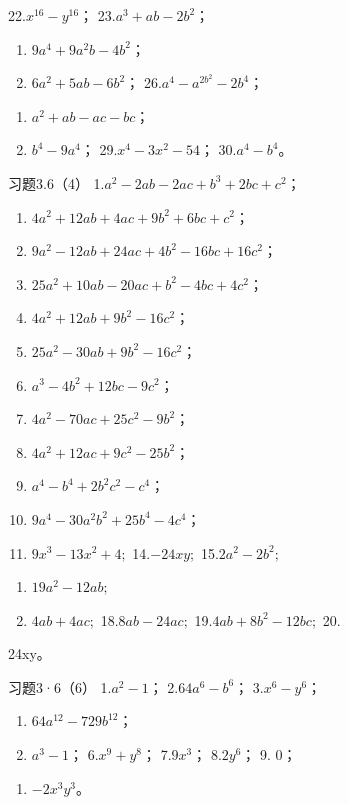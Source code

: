 22.\(x^{16} - y^{16}\)； 23.\(a^3 + ab - 2b^2\)；
\begin{enumerate}[start=24]
\item
  \(9a^4 + 9a^2b - 4b^2\)；
\item
  \(6a^{2} + 5ab - 6b^{2}\)； 26.\(a^4 - a^{2b^2} - 2b^4\)；
\end{enumerate}
\begin{enumerate}[start=27]
\item
  \(a^2 + ab - ac - bc\)；
\item
  \(b^4 - 9a^4\)； 29.\(x^4 - 3x^2 - 54\)； 30.\(a^4 - b^4\)。
\end{enumerate}

习题3.6（4） 1.\(a^2 - 2ab - 2ac + b^3 + 2bc + c^2\)；

\begin{enumerate}[start=2]
\item
  \(4a^{2} + 12ab + 4ac + 9b^{2} + 6bc + c^{2}\)；
\item
  \(9a^{2} - 12ab + 24ac + 4b^{2} - 16bc + 16c^{2}\)；
\item
  \(25a^{2} + 10ab - 20ac + b^{2} - 4bc + 4c^{2}\)；
\item
  \(4a^{2} + 12ab + 9b^{2} - 16c^{2}\)；
\item
  \(25a^{2} - 30ab + 9b^{2} - 16c^{2}\)；
\item
  \(a^{3} - 4b^{2} + 12bc - 9c^{2}\)；
\item
  \(4a^{2} - 70ac + 25c^{2} - 9b^{2}\)；
\item
  \(4a^{2} + 12ac + 9c^{2} - 25b^{2}\)；
\item
  \(a^4 - b^4 + 2b^2c^2 - c^4\)；
\item
  \(9a^4 - 30a^2b^2 + 25b^4 - 4c^4\)；
\item
  \(9x^{3} - 13x^{2} + 4;\) 14.\(-24xy;\) 15.\(2a^{2} - 2b^{2};\)
\end{enumerate}
\begin{enumerate}[start=16]
\item
  \(19a^{2} - 12ab;\)
\item
  \(4ab + 4ac;\) 18.\(8ab - 24ac;\) 19.\(4ab + 8b^{2} - 12bc;\) 20.
\end{enumerate}
24xy。

习题3·6（6） 1.\(a^2 - 1\)； 2.\(64a^6 - b^6\)； 3.\(x^6 - y^6\)；
\begin{enumerate}[start=4]
\item
  \(64a^{12} - 729b^{12}\)；
\item
  \(a^3 - 1\)； 6.\(x^9 + y^8\)； 7.\(9x^3\)； 8.\(2y^6\)； 9. 0；
\end{enumerate}
\begin{enumerate}[start=10]
\item
  \(-2x^3y^3\)。
\end{enumerate}

